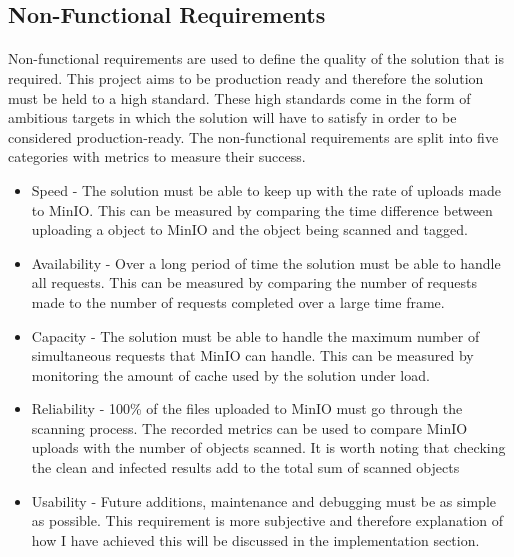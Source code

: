 \documentclass[12pt, conference, final, a4paper, onecolumn, compsoc]{IEEEtran}
\begin{document}


\subsection*{Non-Functional Requirements}
\paragraph{}

Non-functional requirements are used to define the quality of the solution that
is required. This project aims to be production ready and therefore the solution
must be held to a high standard. These high standards come in the form of
ambitious targets in which the solution will have to satisfy in order to be
considered production-ready. The non-functional requirements are split into five
categories with metrics to measure their success.

\begin{itemize}
  \item Speed - The solution must be able to keep up with the rate of uploads
        made to MinIO. This can be measured by comparing the time difference
        between uploading a object to MinIO and the object being scanned and
        tagged.
  \item Availability - Over a long period of time the solution must be able to
        handle all requests. This can be measured by comparing the number of
        requests made to the number of requests completed over a large time
        frame.
  \item Capacity - The solution must be able to handle the maximum number of
        simultaneous requests that MinIO can handle. This can be measured by
        monitoring the amount of cache used by the solution under load.
  \item Reliability - 100\% of the files uploaded to MinIO must go through the
        scanning process. The recorded metrics can be used to compare MinIO
        uploads with the number of objects scanned. It is worth noting that
        checking the clean and infected results add to the total sum of scanned
        objects
  \item Usability - Future additions, maintenance and debugging must be as
        simple as possible. This requirement is more subjective and therefore
        explanation of how I have achieved this will be discussed in the
        implementation section.
\end{itemize}
\end{document}
